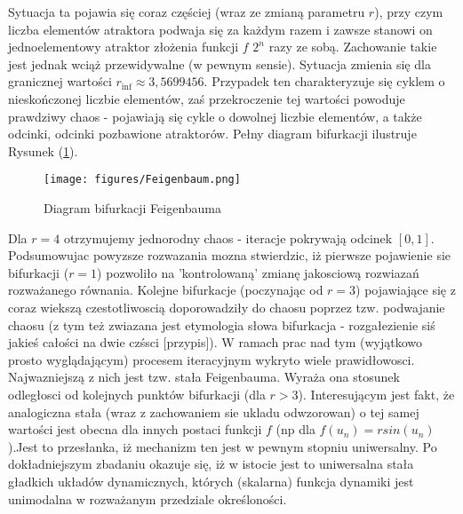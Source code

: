 \documentclass[12pt]{article}
\begin{document}
Sytuacja ta pojawia się coraz częściej (wraz ze zmianą parametru $ r $), przy czym liczba elementów atraktora podwaja się za każdym razem i zawsze stanowi on jednoelementowy atraktor złożenia funkcji $ f $ $ 2^{n} $ razy ze sobą. \newline
Zachowanie takie jest jednak wciąż przewidywalne (w pewnym sensie). Sytuacja zmienia się dla granicznej wartości \cite{Tempczyk} $ r_{\inf} \approx 3,5699456 $. Przypadek ten charakteryzuje się cyklem o nieskończonej liczbie elementów, zaś przekroczenie tej wartości powoduje prawdziwy chaos - pojawiają się cykle o dowolnej liczbie elementów, a także odcinki, odcinki pozbawione atraktorów. Pełny diagram bifurkacji ilustruje Rysunek (\ref{Fig8}).
\begin{figure}[H]
	\texttt{[image: figures/Feigenbaum.png]} 
	\centering
	\caption{Diagram bifurkacji Feigenbauma}
	\label{Fig8}
\end{figure}
Dla $ r=4 $ otrzymujemy jednorodny chaos - iteracje pokrywają odcinek $ [0,1] $.\newline
Podsumowujac powyzsze rozwazania mozna stwierdzic, iż pierwsze pojawienie sie bifurkacji ($ r = 1$) pozwoliło na 'kontrolowaną' zmianę jakosciową rozwiazań rozważanego równania. Kolejne bifurkacje (poczynając od $ r = 3$) pojawiające się z coraz wiekszą czestotliwoscią doporowadziły do chaosu poprzez tzw. podwajanie chaosu (z tym też zwiazana jest etymologia słowa bifurkacja - rozgałezienie siś jakieś całości na dwie czśsci [przypis]). W ramach prac nad tym (wyjątkowo prosto wyglądającym) procesem iteracyjnym wykryto wiele prawidłowosci. Najwazniejszą z nich jest tzw. stała Feigenbauma. Wyraża ona stosunek odległosci od kolejnych punktów bifurkacji (dla $r>3$). Interesującym jest fakt, że analogiczna stała (wraz z zachowaniem sie ukladu odwzorowan) o tej samej wartości jest obecna dla innych postaci funkcji $f$ (np dla $ f(u_{n}) = rsin(u_{n})$).Jest to przesłanka, iż mechanizm ten jest w pewnym stopniu uniwersalny. Po dokładniejszym zbadaniu okazuje się, iż w istocie jest to uniwersalna stała gładkich układów dynamicznych, których (skalarna) funkcja dynamiki jest unimodalna w rozważanym przedziale określoności.
\end{document}
